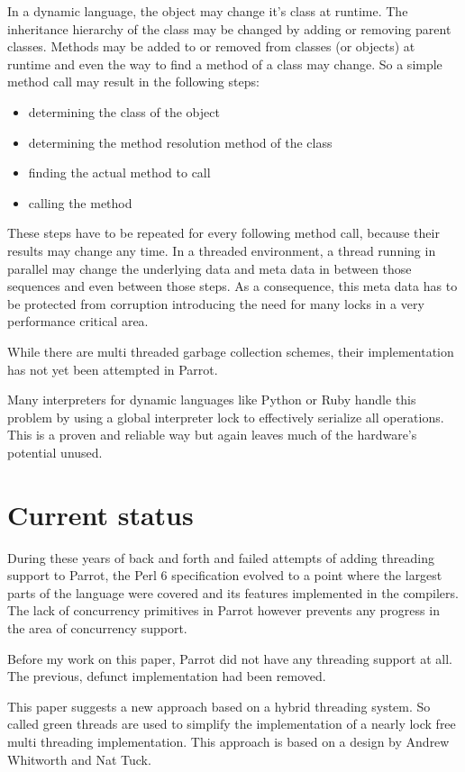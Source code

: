 \documentclass[bachelor,english]{hgbthesis}
\begin{document}
In a dynamic language, the object may change it's class at runtime. The inheritance hierarchy of the class may be changed by adding or removing parent classes. Methods may be added to or removed from classes (or objects) at runtime and even the way to find a method of a class may change. So a simple method call may result in the following steps:
%
\begin{itemize}
\item determining the class of the object
\item determining the method resolution method of the class
\item finding the actual method to call
\item calling the method
\end{itemize}
%
These steps have to be repeated for every following method call, because their results may change any time. In a threaded environment, a thread running in parallel may change the underlying data and meta data in between those sequences and even between those steps. As a consequence, this meta data has to be protected from corruption introducing the need for many locks in a very performance critical area.

While there are multi threaded garbage collection schemes, their implementation has not yet been attempted in Parrot.

Many interpreters for dynamic languages like Python or Ruby handle this problem by using a global interpreter lock to effectively serialize all operations. This is a proven and reliable way but again leaves much of the hardware's potential unused.

\section{Current status}

During these years of back and forth and failed attempts of adding threading support to Parrot, the Perl 6 specification evolved to a point where the largest parts of the language were covered and its features implemented in the compilers. The lack of concurrency primitives in Parrot however prevents any progress in the area of concurrency support.

Before my work on this paper, Parrot did not have any threading support at all. The previous, defunct implementation had been removed.

This paper suggests a new approach based on a hybrid threading system. So called green threads are used to simplify the implementation of a nearly lock free multi threading implementation. This approach is based on a design by Andrew Whitworth and Nat Tuck.
\end{document}

